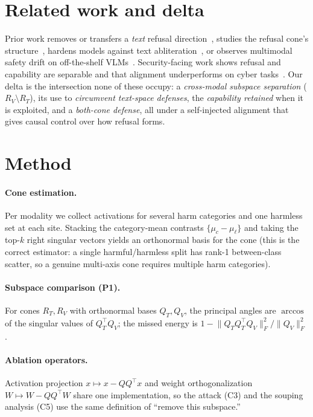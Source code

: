 \documentclass[11pt]{article}
\begin{document}
\section{Related work and delta}
Prior work removes or transfers a \emph{text} refusal
direction~\cite{arditi2024refusal,cls2026instability,mmrefusal2026}, studies the
refusal cone's structure~\cite{wollschlager2025cones,rfmagop2026}, hardens models
against text abliteration~\cite{amra2026,deeprefusal2025,extendedrefusal2025}, or
observes multimodal safety drift on off-the-shelf
VLMs~\cite{mmcollapse2026,repit2025,visualjailbreak2026}. Security-facing work shows
refusal and capability are separable and that alignment underperforms on
cyber tasks~\cite{ablatesecurity2026,codeabliteration2026,cyberscale2026}. Our delta
is the intersection none of these occupy: a \emph{cross-modal subspace separation}
($R_V\setminus R_T$), its use to \emph{circumvent text-space defenses}, the
\emph{capability retained} when it is exploited, and a \emph{both-cone defense},
all under a self-injected alignment that gives causal control over how refusal forms.

\section{Method}
\paragraph{Cone estimation.} Per modality we collect activations for several harm
categories and one harmless set at each site. Stacking the category-mean contrasts
$\{\mu_c - \mu_\ell\}$ and taking the top-$k$ right singular vectors yields an
orthonormal basis for the cone (this is the correct estimator: a single
harmful/harmless split has rank-1 between-class scatter, so a genuine multi-axis
cone requires multiple harm categories).

\paragraph{Subspace comparison (P1).} For cones $R_T,R_V$ with orthonormal bases
$Q_T,Q_V$, the principal angles are $\arccos$ of the singular values of
$Q_T^\top Q_V$; the missed energy is
$1 - \lVert Q_T Q_T^\top Q_V\rVert_F^2 / \lVert Q_V\rVert_F^2$.

\paragraph{Ablation operators.} Activation projection $x\mapsto x-QQ^\top x$ and
weight orthogonalization $W\mapsto W-QQ^\top W$ share one implementation, so the
attack (C3) and the souping analysis (C5) use the same definition of ``remove this
subspace.''
\end{document}
